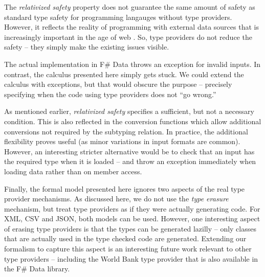 \documentclass[preprint]{sigplanconf}
\begin{document}
The \emph{relativized safety} property does not guarantee the same amount of safety as standard type safety
for programming langauges without type providers. However, it reflects the reality of programming with external
data sources that is increasingly important in the age of web \cite{age-of-web}. So, type providers do not
reduce the safety -- they simply make the existing issues visible.

The actual implementation in F\# Data throws an exception for invalid inputs. In contrast, the calculus
presented here simply gets stuck. We could extend the calculus with exceptions, but that would obscure the 
purpose -- precisely specifying when the code using type providers does not ``go wrong.''

As mentioned earlier, \emph{relativized safety} specifies a sufficient, but not a necessary condition.
This is also reflected in the conversion functions which allow additional conversions not required by 
the subtyping relation. In practice, the additional flexibility proves useful (as minor variations in 
input formats are common). However, an interesting stricter alternative would be to check that an input 
has the required type when it is loaded -- and throw an exception immediately when loading data rather than 
on member access.

Finally, the formal model presented here ignores two aspects of the real type provider mechanisms. As discussed
here, we do not use the \emph{type erasure} mechanism, but treat type providers as if they were actually 
generating code. For XML, CSV and JSON, both models can be used. However, one interesting aspect of erasing 
type providers is that the types can be generated lazilly -- only classes that are actually used in the type
checked code are generated. Extending our formalism to capture this aspect is an interesting future work
relevant to other type providers -- including the World Bank type provider that is also available
in the F\# Data library.



%
%
\end{document}
